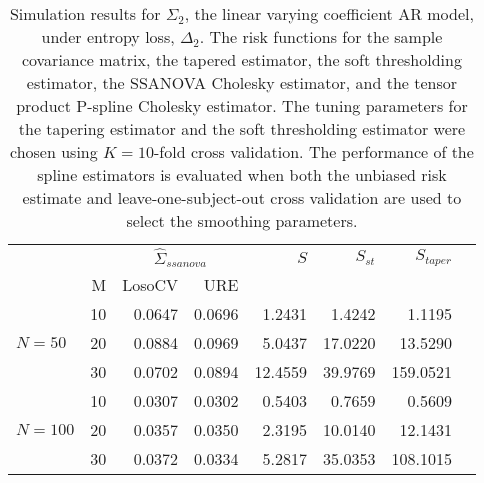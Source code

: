 \documentclass[12pt]{article}
\theoremstyle{definition}
\begin{document}
\begin{table}[ht]
\centering
\caption{Simulation results for $\Sigma_2$, the linear varying coefficient AR model, under entropy loss, $\Delta_2$. The risk functions for the sample covariance matrix, the tapered estimator, the soft thresholding estimator, the SSANOVA Cholesky estimator, and the tensor product P-spline Cholesky estimator. The tuning parameters for the tapering estimator and the soft thresholding estimator were chosen using $K = 10$-fold cross validation. The performance of the spline estimators is evaluated when both the unbiased risk estimate and leave-one-subject-out cross validation are used to select the smoothing parameters.}
\begin{tabular}{l|r|rrrrrr}
&  & \multicolumn{2}{c}{$\hat{\Sigma}_{ssanova}$} & $S$ & $S_{st}$ & $S_{taper}$ \\ 
&M & \mbox{LosoCV} & \mbox{URE} &  \\ 
  \hline
 &    10 & 0.0647 & 0.0696	 & 1.2431 & 1.4242 & 1.1195\\ 
$N = 50$ &    20 & 0.0884 & 0.0969 & 5.0437 & 17.0220 & 13.5290\\ 
&    30 & 0.0702 & 0.0894 & 12.4559 & 39.9769 & 159.0521 \\ 
   \hdashline
&    10 & 0.0307 & 0.0302 & 0.5403& 0.7659 & 0.5609 \\ 
$N = 100 $ &    20 & 0.0357 & 0.0350  & 2.3195 & 10.0140 & 12.1431 \\ 
   &    30 & 0.0372 & 0.0334 & 5.2817& 35.0353 & 108.1015  \\ 
\end{tabular}
\end{table}

\end{document}
